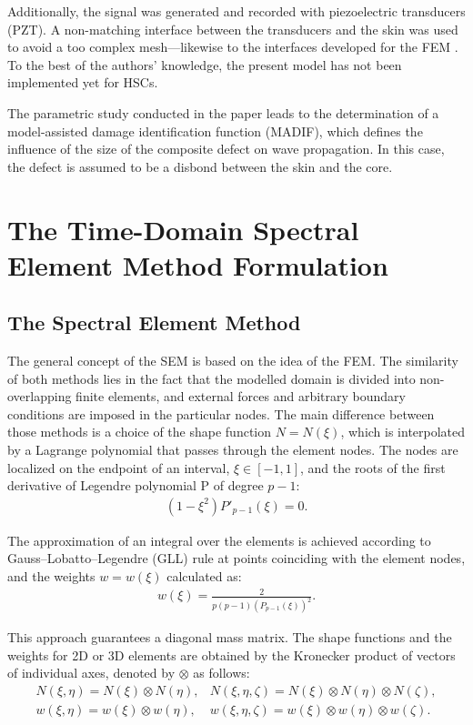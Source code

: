 \documentclass[sensors,article,accept,moreauthors,pdftex]{Definitions/mdpi}
\begin{document}
Additionally, the signal was generated and recorded with piezoelectric transducers (PZT).
A non-matching interface between the transducers and the skin was used to avoid a too complex mesh---likewise to the interfaces developed for the FEM \cite{flemisch2000elasto, flemisch2012non}. 
To the best of the authors’ knowledge, the present model has not been implemented yet for  HSCs.

The parametric study conducted in the paper leads to the determination of a model-assisted damage identification function (MADIF), which defines the influence of the size of the composite defect on wave propagation.
In this case, the defect is assumed to be a disbond between the skin and the core.
\section{The Time-Domain Spectral Element Method Formulation}
\label{sec:time_SEM}
\subsection{The Spectral Element Method}
\label{sec:sem}
The general concept of the SEM is based on the idea of the FEM.
The similarity of both methods lies in the fact that the modelled domain is divided into non-overlapping finite elements, and external forces and arbitrary boundary conditions are imposed in the particular nodes.
The main difference between those methods is a choice of the shape function \( N=N(\xi )\), which is interpolated by a Lagrange polynomial that passes through the element nodes. The nodes are localized on the endpoint of an interval, \(\xi\in[-1,1]\), and the roots of the first derivative of Legendre polynomial P of degree \(p-1\):
\begin{eqnarray}
(1-\xi^2)P'_{p-1}(\xi)=0.
\label{eq:nodes}
\end{eqnarray}

The approximation of an integral over the elements is achieved according to Gauss--Lobatto--Legendre (GLL) rule at points coinciding with the element nodes, 
and the weights \(w=w(\xi)\) calculated as:
\begin{eqnarray}
{w(\xi)} = \frac{2}{p(p-1)(P_{p-1}(\xi))^2}.
\label{eq:weights}
\end{eqnarray}

This approach guarantees a diagonal mass matrix.
The shape functions and the weights for 2D or 3D elements are obtained by the Kronecker product of vectors of individual axes, denoted by \(\otimes\) as follows:
\begin{eqnarray}
N(\xi,\eta) = N(\xi)\otimes N(\eta), & N(\xi,\eta,\zeta) = N(\xi)\otimes N(\eta)\otimes N(\zeta), \nonumber\\
w(\xi,\eta) = w(\xi)\otimes w(\eta), & w(\xi,\eta,\zeta) = w(\xi)\otimes w(\eta)\otimes w(\zeta).
\label{eq:3Dshape_weights}
\end{eqnarray}
\end{document}
